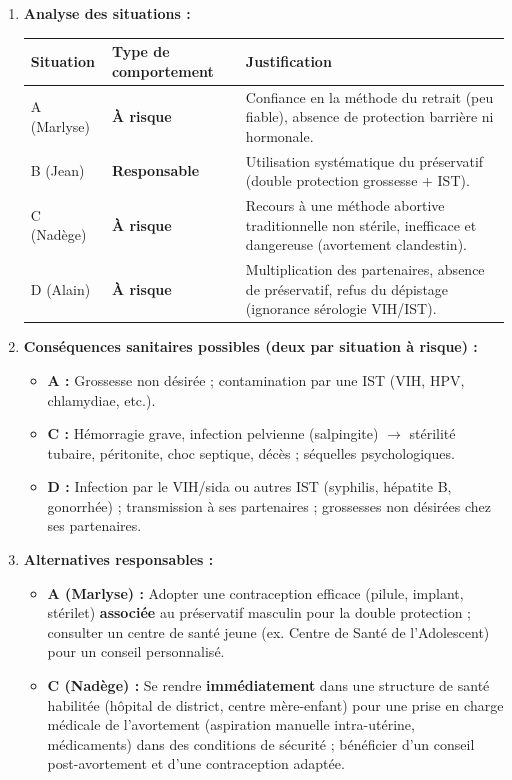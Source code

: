 \documentclass[11pt]{article}
\begin{document}
\begin{corrige}
\begin{enumerate}
\item \textbf{Analyse des situations :}
\begin{center}
\begin{tabularx}{\linewidth}{|l|X|X|}\hline
\rowcolor{popblueL} \textbf{Situation} & \textbf{Type de comportement} & \textbf{Justification} \\ \hline
A (Marlyse) & \textbf{À risque} & Confiance en la méthode du retrait (peu fiable), absence de protection barrière ni hormonale. \\ \hline
B (Jean) & \textbf{Responsable} & Utilisation systématique du préservatif (double protection grossesse + IST). \\ \hline
C (Nadège) & \textbf{À risque} & Recours à une méthode abortive traditionnelle non stérile, inefficace et dangereuse (avortement clandestin). \\ \hline
D (Alain) & \textbf{À risque} & Multiplication des partenaires, absence de préservatif, refus du dépistage (ignorance sérologie VIH/IST). \\ \hline
\end{tabularx}
\end{center}
\item \textbf{Conséquences sanitaires possibles (deux par situation à risque) :}
\begin{itemize}
\item \textbf{A :} Grossesse non désirée ; contamination par une IST (VIH, HPV, chlamydiae, etc.).
\item \textbf{C :} Hémorragie grave, infection pelvienne (salpingite) $\rightarrow$ stérilité tubaire, péritonite, choc septique, décès ; séquelles psychologiques.
\item \textbf{D :} Infection par le VIH/sida ou autres IST (syphilis, hépatite B, gonorrhée) ; transmission à ses partenaires ; grossesses non désirées chez ses partenaires.
\end{itemize}
\item \textbf{Alternatives responsables :}
\begin{itemize}
\item \textbf{A (Marlyse) :} Adopter une contraception efficace (pilule, implant, stérilet) \textbf{associée} au préservatif masculin pour la double protection ; consulter un centre de santé jeune (ex. Centre de Santé de l'Adolescent) pour un conseil personnalisé.
\item \textbf{C (Nadège) :} Se rendre \textbf{immédiatement} dans une structure de santé habilitée (hôpital de district, centre mère-enfant) pour une prise en charge médicale de l'avortement (aspiration manuelle intra-utérine, médicaments) dans des conditions de sécurité ; bénéficier d'un conseil post-avortement et d'une contraception adaptée.

\end{itemize}
\end{enumerate}
\end{corrige}
\end{document}
